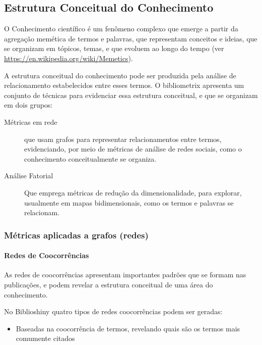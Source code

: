 \subsection{Estrutura Conceitual do Conhecimento}

O Conhecimento científico é um fenômeno complexo que emerge a partir da agregação memética de termos e palavras, que representam conceitos e ideias, que se organizam em tópicos, temas, e que evoluem ao longo do tempo (ver \url{https://en.wikipedia.org/wiki/Memetics}).

A estrutura conceitual do conhecimento pode ser produzida pela análise de relacionamento estabelecidos entre esses termos. O bibliometrix apresenta um conjunto de técnicas para evidenciar essa estrutura conceitual, e que se organizam em dois grupos:
\begin{description}
    \item [Métricas em rede] que usam grafos para representar relacionamentos entre termos, evidenciando, por meio de métricas de análise de redes sociais, como o conhecimento conceitualmente se organiza.
    \item [Análise Fatorial] Que emprega métricas de redução da dimensionalidade, para explorar, usualmente em mapas bidimensionais, como os termos e palavras se relacionam. 
\end{description}

\subsubsection{Métricas aplicadas a grafos (redes)}

\paragraph{Redes de Coocorrências}

As redes de coocorrências apresentam importantes padrões que se formam nas publicações, e podem revelar a estrutura conceitual de uma área do conhecimento.

No Biblioshiny quatro tipos de redes coocorrências podem ser geradas:
\begin{itemize}
    \item Baseadas na coocorrência de termos, revelando quais são os termos mais comumente citados 
\end{itemize}


